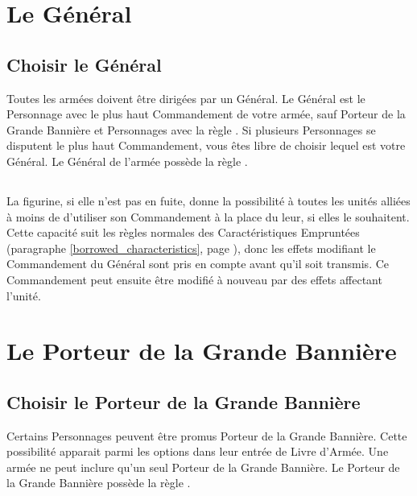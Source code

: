 \newpage
\hypertarget{thegeneral}{\section{Le Général}}
\label{thegeneral}

\subsection{Choisir le Général}

Toutes les armées doivent être dirigées par un Général. Le Général est le Personnage avec le plus haut Commandement de votre armée, sauf Porteur de la Grande Bannière et Personnages avec la règle \notaleader{}. Si plusieurs Personnages se disputent le plus haut Commandement, vous êtes libre de choisir lequel est votre Général. Le Général de l'armée possède la règle \inspiringpresence{}.

\subsection{\inspiringpresence}

La figurine, si elle n'est pas en fuite, donne la possibilité à toutes les unités alliées à moins de  d'utiliser son Commandement à la place du leur, si elles le souhaitent. Cette capacité suit les règles normales des Caractéristiques Empruntées (paragraphe \ref{borrowed_characteristics}, page \pageref{borrowed_characteristics}), donc les effets modifiant le Commandement du Général sont pris en compte avant qu'il soit transmis. Ce Commandement peut ensuite être modifié à nouveau par des effets affectant l'unité.

\hypertarget{thebsb}{\section{Le Porteur de la Grande Bannière}}
\label{thebsb}

\subsection{Choisir le Porteur de la Grande Bannière}

Certains Personnages peuvent être promus Porteur de la Grande Bannière. Cette possibilité apparait parmi les options dans leur entrée de Livre d'Armée. Une armée ne peut inclure qu'un seul Porteur de la Grande Bannière. Le Porteur de la Grande Bannière possède la règle \holdyourground{}.

